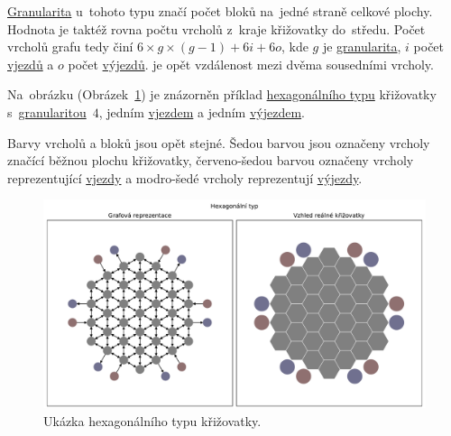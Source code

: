 \hyperref[par:granularita]{Granularita} u~tohoto typu značí počet bloků na~jedné straně celkové plochy.
Hodnota je taktéž rovna počtu vrcholů z~kraje křižovatky do~středu.
Počet vrcholů grafu tedy činí $6 \times g \times (g-1) + 6i + 6o$,
kde $g$ je \hyperref[par:granularita]{granularita},
$i$ počet \hyperref[par:vjezdy]{vjezdů} a $o$ počet \hyperref[par:vyjezdy]{výjezdů}.
 je opět vzdálenost mezi dvěma sousedními vrcholy.

Na~obrázku (Obrázek~\ref{fig:hexagonal_type_graph}) je znázorněn příklad
\hyperref[subsec:hexagonalni_typ]{hexagonálního typu} křižovatky s~\hyperref[par:granularita]{granularitou}~$4$,
jedním \hyperref[par:vjezdy]{vjezdem} a jedním \hyperref[par:vyjezdy]{výjezdem}.

Barvy vrcholů a bloků jsou opět stejné.
Šedou barvou jsou označeny vrcholy značící běžnou plochu křižovatky,
červeno-šedou barvou označeny vrcholy reprezentující \hyperref[par:vjezdy]{vjezdy} a
modro-šedé vrcholy reprezentují \hyperref[par:vyjezdy]{výjezdy}.

\begin{figure}[h]
	\centering
	\includegraphics[width=\textwidth]{../img/Hexagonal_grid}
	\caption{Ukázka hexagonálního typu křižovatky.}
	\label{fig:hexagonal_type_graph}
\end{figure}
